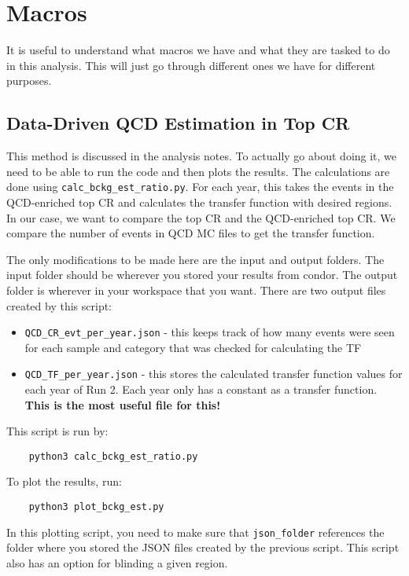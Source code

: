 \section{Macros}

It is useful to understand what macros we have and what they are tasked to do in this analysis. This will just go through different ones we have for different purposes.

\subsection{Data-Driven QCD Estimation in Top CR}
This method is discussed in the analysis notes. To actually go about doing it, we need to be able to run the code and then plots the results. The calculations are done using \verb|calc_bckg_est_ratio.py|. For each  year, this takes the events in the QCD-enriched top CR and calculates the transfer function with desired regions. In our case, we want to compare the top CR and the QCD-enriched top CR. We compare the number of events in QCD MC files to get the transfer function. 

The only modifications to be made here are the input and output folders. The input folder should be wherever you stored your results from condor. The output folder is wherever in your workspace that you want. There are two output files created by this script:

\begin{itemize}
    \item \verb|QCD_CR_evt_per_year.json| - this keeps track of how many events were seen for each sample and category that was checked for calculating the TF
    \item \verb|QCD_TF_per_year.json| - this stores the calculated transfer function values for each year of Run 2. Each year only has a constant as a transfer function. \textbf{This is the most useful file for this!}
\end{itemize}

\noindent This script is run by:

\begin{verbatim}
    python3 calc_bckg_est_ratio.py
\end{verbatim}

\noindent To plot the results, run:

\begin{verbatim}
    python3 plot_bckg_est.py
\end{verbatim}

\noindent In this plotting script, you need to make sure that \verb|json_folder| references the folder where you stored the JSON files created by the previous script. This script also has an option for blinding a given region.

